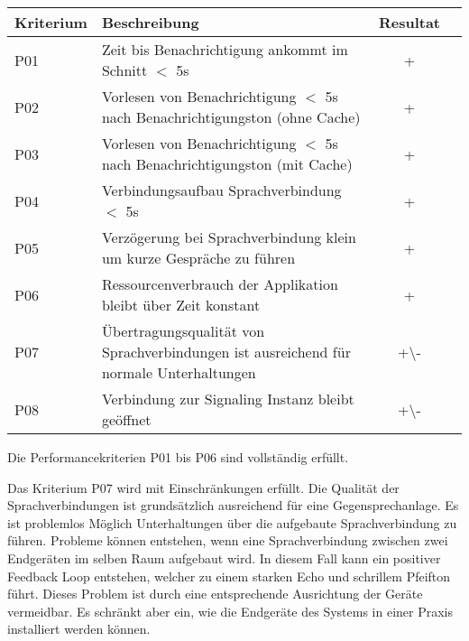 \begin{table}[h]
    \centering
    \begin{tabular}{|l|p{11cm}|c|c|}
        \hline
        \textbf{Kriterium} & \textbf{Beschreibung} & \textbf{Resultat} \\
        \hline
        P01         & Zeit bis Benachrichtigung ankommt im Schnitt $<$ 5s & +\\
        \hline
        P02         & Vorlesen von Benachrichtigung $<$ 5s nach Benachrichtigungston (ohne Cache) & +\\
        \hline
        P03         & Vorlesen von Benachrichtigung $<$ 5s nach Benachrichtigungston (mit Cache) & +\\
        \hline
        P04         & Verbindungsaufbau Sprachverbindung $<$ 5s  & +\\
        \hline
        P05         & Verzögerung bei Sprachverbindung klein um kurze Gespräche zu führen & +\\
        \hline
        P06         & Ressourcenverbrauch der Applikation bleibt über Zeit konstant & +\\
        \hline
        P07         & Übertragungsqualität von Sprachverbindungen ist ausreichend für normale Unterhaltungen & +\textbackslash- \\
        \hline
        P08         & Verbindung zur Signaling Instanz bleibt geöffnet & +\textbackslash- \\
        \hline
    \end{tabular}\label{tab:testplan_performance}
\end{table}

Die Performancekriterien P01 bis P06 sind vollständig erfüllt.

Das Kriterium P07 wird mit Einschränkungen erfüllt.
Die Qualität der Sprachverbindungen ist grundsätzlich ausreichend für eine Gegensprechanlage.
Es ist problemlos Möglich Unterhaltungen über die aufgebaute Sprachverbindung zu führen.
Probleme können entstehen, wenn eine Sprachverbindung zwischen zwei Endgeräten im selben Raum aufgebaut wird.
In diesem Fall kann ein positiver Feedback Loop entstehen, welcher zu einem starken Echo und schrillem Pfeifton führt.
Dieses Problem ist durch eine entsprechende Ausrichtung der Geräte vermeidbar.
Es schränkt aber ein, wie die Endgeräte des Systems in einer Praxis installiert werden können.

